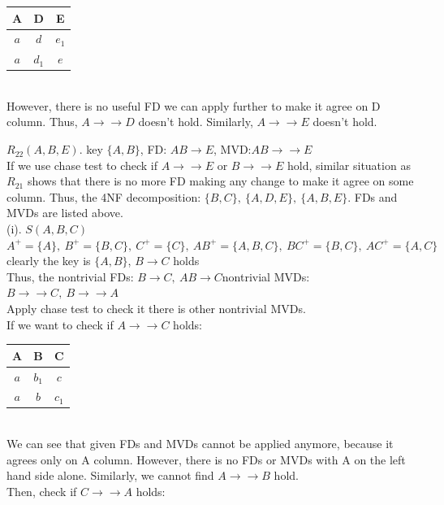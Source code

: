 \documentclass[12pt]{article}
\begin{document}
\begin{tabular}{|c|c|c|}
\hline
A & D & E  \\
\hline
$a$ & $d$ & $e_{1}$  \\
\hline
$a$ & $d_{1}$ & $e$  \\
\hline
\end{tabular}\\

However, there is no useful FD we can apply further to make it agree on D column. Thus, $A\rightarrow\rightarrow D$ doesn't hold. Similarly, $A\rightarrow\rightarrow E$ doesn't hold. 



$R_{22}(A,B,E)$. key $\{A,B\}$, FD: $AB\rightarrow E$, MVD:$AB\rightarrow\rightarrow E$\\
If we use chase test to check if $A\rightarrow\rightarrow E$ or $B\rightarrow\rightarrow E$ hold, similar situation as $R_{21}$ shows that there is no more FD making any change to make it agree on some column. 
Thus, the 4NF decomposition: $\{B,C\},\ \{A,D,E\},\ \{A,B,E\}$. FDs and MVDs are listed above.\\

(i). $S(A,B,C)$\qquad $A^{+} = \{A\},\ B^{+} = \{B, C\},\ C^{+} = \{C\},\ AB^{+} = \{A, B, C\},\ BC^{+} = \{B, C\},\ AC^{+} = \{A, C\}$
 clearly the key is $\{A,B\}$, $B\rightarrow C$ holds \\
Thus, the nontrivial FDs: $B\rightarrow C,\ AB\rightarrow C$\qquad nontrivial MVDs: $B\rightarrow\rightarrow C,\ B\rightarrow\rightarrow A$\\
Apply chase test to check it there is other nontrivial MVDs.\\
If we want to check if $A\rightarrow\rightarrow C$ holds:\\

\begin{tabular}{|c|c|c|}
\hline
A & B & C  \\
\hline
$a$ & $b_{1}$ & $c$  \\
\hline
$a$ & $b$ & $c_{1}$  \\
\hline
\end{tabular}\\

We can see that given FDs and MVDs cannot be applied anymore, because it agrees only on A column. However, there is no FDs or MVDs with A on the left hand side alone. Similarly, we cannot find $A\rightarrow\rightarrow B$ hold.\\
Then, check if $C\rightarrow\rightarrow A$ holds:\\
\end{document}

